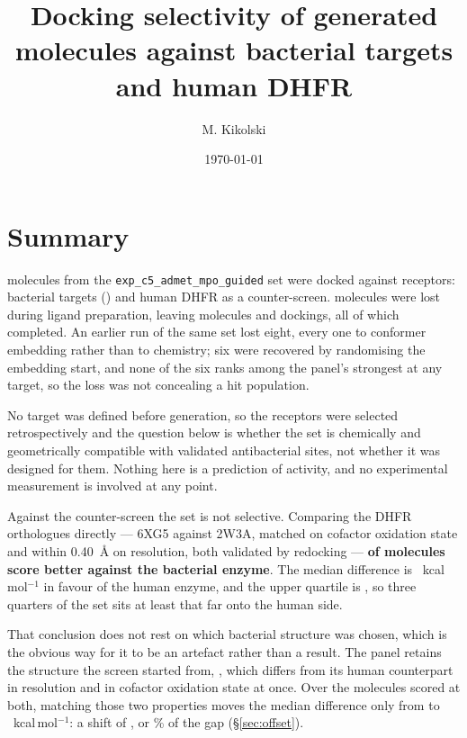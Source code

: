 \documentclass[11pt,a4paper]{article}
\title{\vspace{-1.6cm}Docking selectivity of \nMolecules{} generated molecules
against \nBacterial{} bacterial targets and human DHFR}
\author{M. Kikolski}
\date{\today}
\begin{document}
\maketitle
\vspace{-0.8cm}
\provisionalnote

\section{Summary}

\nInput{} molecules from the \texttt{exp\_c5\_admet\_mpo\_guided} set were
docked against \nReceptors{} receptors: \nBacterial{} bacterial targets
(\bacterialList) and human DHFR as a counter-screen.
\nScrubFailed{} molecules were lost during ligand preparation, leaving
\nMolecules{} molecules and \nDockings{} dockings, all of which completed.
An earlier run of the same set lost eight, every one to conformer embedding
rather than to chemistry; six were recovered by randomising the embedding
start, and none of the six ranks among the panel's strongest at any target,
so the loss was not concealing a hit population.

No target was defined before generation, so the receptors were selected
retrospectively and the question below is whether the set is chemically and
geometrically compatible with validated antibacterial sites, not whether it
was designed for them. Nothing here is a prediction of activity, and no
experimental measurement is involved at any point.

Against the counter-screen the set is not selective. Comparing the DHFR
orthologues directly --- 6XG5 against 2W3A, matched on cofactor oxidation
state and within 0.40~\AA{} on resolution, both validated by redocking ---
\textbf{\selDhfrN{} of \nMolecules{} molecules score better against the
bacterial enzyme}. The median difference is
\selDhfrMedian{}~kcal\,mol$^{-1}$ in favour of the human enzyme, and the
upper quartile is \selDhfrQHi{}, so three quarters of the set sits at least
that far onto the human side.

That conclusion does not rest on which bacterial structure was chosen, which
is the obvious way for it to be an artefact rather than a result. The panel
retains the structure the screen started from, \offsetControl{}, which differs
from its human counterpart in resolution and in cofactor oxidation state at
once.
Over the \nDhfrCommon{} molecules scored at both, matching those two
properties moves the median difference only from \offsetControlMedian{} to
\offsetPrimaryMedian{}~kcal\,mol$^{-1}$: a shift of \offsetShift{}, or
\offsetPct\% of the gap (\S\ref{sec:offset}).
\end{document}
